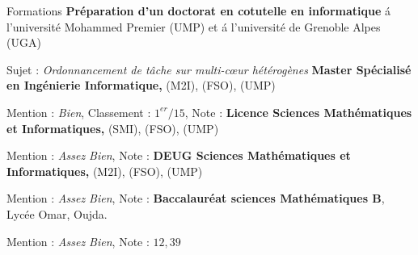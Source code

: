 \begin{rubric}{Formations}
\entry*[$2015$ -- $2018$]%
	\textbf{Pr\'eparation d'un doctorat en cotutelle en informatique} \'a l'universit\'e Mohammed Premier (UMP) et \'a l'universit\'e de Grenoble Alpes (UGA)
	\par Sujet : \emph{Ordonnancement de tâche sur multi-cœur hétérogènes}
%
\entry*[$2014$]%
	\textbf{Master Spécialisé en Ingénierie Informatique,} (M2I), (FSO), (UMP)\par
	Mention : \emph{Bien}, Classement : $1^{er}/15$, Note : 
%
\entry*[$2012$]%
	\textbf{Licence Sciences Mathématiques et Informatiques,} (SMI), (FSO), (UMP) \par
	Mention : \emph{Assez Bien}, Note :  
%
\entry*[$2011$]%
	\textbf{DEUG Sciences Mathématiques et Informatiques,} (M$2$I), (FSO), (UMP)\par
	Mention : \emph{Assez Bien}, Note : 
%
\entry*[$2008$]%
	\textbf{Baccalauréat sciences Mathématiques B}, Lycée Omar, Oujda.\par
	Mention : \emph{Assez Bien}, Note : $12,39$
%
\end{rubric}
